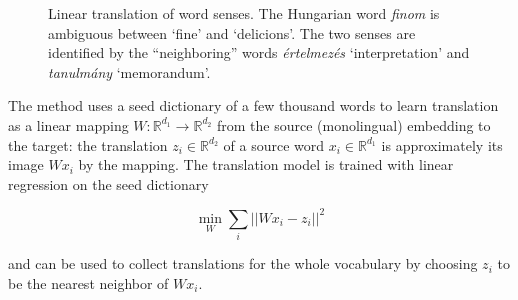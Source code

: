 \documentclass[11pt]{article}
\newcommand{\Ro}{\mathbb{R}^{d_1}}
\newcommand{\Rt}{\mathbb{R}^{d_2}}
\begin{document}
\begin{figure}[b]
    \centering
    \resizebox{\columnwidth}{!} {
    }
    \caption{Linear translation of word senses. The Hungarian word
        \emph{finom} is ambiguous between `fine' and `delicions'.  The two
        senses are identified by the ``neighboring'' words \emph{értelmezés}
    `interpretation' and \emph{tanulmány} `memorandum'.
    } \label{fig:AdaGram}
\end{figure}

The method uses a seed dictionary of a few thousand words to learn translation
as a linear mapping $W: \mathbb{R}^{d_1}\rightarrow \mathbb{R}^{d_2}$ from the
source (monolingual) embedding to the target: the translation $z_i \in \Rt$ of
a source word $x_i \in \Ro$ is approximately its image $Wx_i$ by the mapping.
The translation model is trained with linear regression on the seed dictionary

\[\min_W \sum_i || Wx_i - z_i ||^2 \]

\noindent and can be used to collect translations for the whole vocabulary by
choosing $z_i$ to be the nearest neighbor of $Wx_i$.

\end{document}
